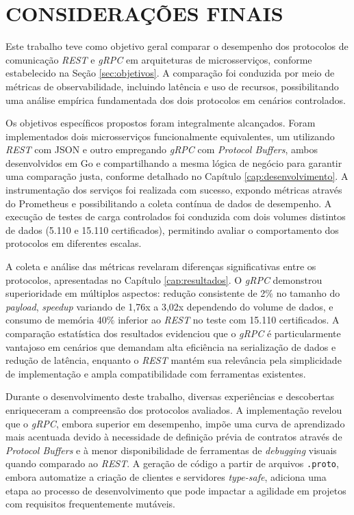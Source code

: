 \chapter{CONSIDERAÇÕES FINAIS} \label{cap:consideracoes}

Este trabalho teve como objetivo geral comparar o desempenho dos protocolos de comunicação \textit{REST} e \textit{gRPC} em arquiteturas de microsserviços, conforme estabelecido na Seção \ref{sec:objetivos}. A comparação foi conduzida por meio de métricas de observabilidade, incluindo latência e uso de recursos, possibilitando uma análise empírica fundamentada dos dois protocolos em cenários controlados.

Os objetivos específicos propostos foram integralmente alcançados. Foram implementados dois microsserviços funcionalmente equivalentes, um utilizando \textit{REST} com JSON e outro empregando \textit{gRPC} com \textit{Protocol Buffers}, ambos desenvolvidos em Go e compartilhando a mesma lógica de negócio para garantir uma comparação justa, conforme detalhado no Capítulo \ref{cap:desenvolvimento}. A instrumentação dos serviços foi realizada com sucesso, expondo métricas através do Prometheus e possibilitando a coleta contínua de dados de desempenho. A execução de testes de carga controlados foi conduzida com dois volumes distintos de dados (5.110 e 15.110 certificados), permitindo avaliar o comportamento dos protocolos em diferentes escalas.

A coleta e análise das métricas revelaram diferenças significativas entre os protocolos, apresentadas no Capítulo \ref{cap:resultados}. O \textit{gRPC} demonstrou superioridade em múltiplos aspectos: redução consistente de 2\% no tamanho do \textit{payload}, \textit{speedup} variando de 1,76x a 3,02x dependendo do volume de dados, e consumo de memória 40\% inferior ao \textit{REST} no teste com 15.110 certificados. A comparação estatística dos resultados evidenciou que o \textit{gRPC} é particularmente vantajoso em cenários que demandam alta eficiência na serialização de dados e redução de latência, enquanto o \textit{REST} mantém sua relevância pela simplicidade de implementação e ampla compatibilidade com ferramentas existentes.

Durante o desenvolvimento deste trabalho, diversas experiências e descobertas enriqueceram a compreensão dos protocolos avaliados. A implementação revelou que o \textit{gRPC}, embora superior em desempenho, impõe uma curva de aprendizado mais acentuada devido à necessidade de definição prévia de contratos através de \textit{Protocol Buffers} e à menor disponibilidade de ferramentas de \textit{debugging} visuais quando comparado ao \textit{REST}. A geração de código a partir de arquivos \texttt{.proto}, embora automatize a criação de clientes e servidores \textit{type-safe}, adiciona uma etapa ao processo de desenvolvimento que pode impactar a agilidade em projetos com requisitos frequentemente mutáveis.

